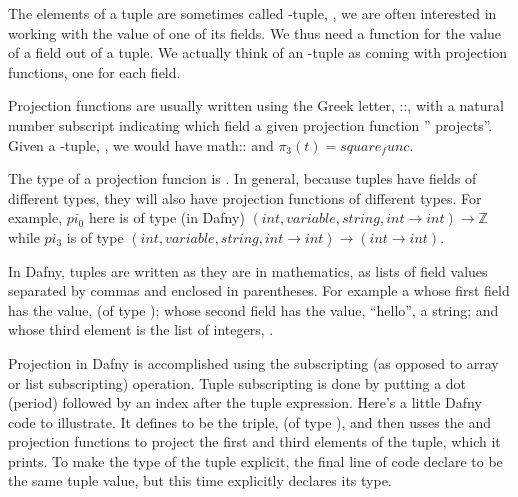\documentclass[letterpaper,10pt,english]{sphinxmanual}
\begin{document}
The elements of a tuple are sometimes called -tuple, , we are often interested in working with the
value of one of its fields. We thus need a function for 
the value of a field out of a tuple. We actually think of an -tuple
as coming with  projection functions, one for each field.

Projection functions are usually written using the Greek letter,
::, with a natural number subscript indicating which field a
given projection function ” projects”. Given a -tuple, , we would have math:: and
\(\pi_3(t) = square_func.\)

The type of a projection funcion is . In general, because tuples have fields of different types, they
will also have projection functions of different types. For example,
\(pi_0\) here is of type (in Dafny) \((int, variable, string,
int \rightarrow int) \rightarrow {\mathbb Z}\) while \(pi_3\) is of
type \((int, variable, string, int \rightarrow int) \rightarrow
(int \rightarrow int).\)

In Dafny, tuples are written as they are in mathematics, as lists of
field values separated by commas and enclosed in parentheses.  For
example  a  whose
first field has the value,  (of type ); whose second field has
the value, “hello”, a string; and whose third element is the list of
integers, \sphinxstyleemphasis{{[}2, 4, 6{]}}.

Projection in Dafny is accomplished using the  subscripting (as
opposed to array or list subscripting) operation. Tuple subscripting is
done by putting a dot (period) followed by an index after the tuple
expression. Here’s a little Dafny code to illustrate. It defines 
to be the triple,  (of type ),
and then usses the  and  projection functions to project the
first and third elements of the tuple, which it prints. To make the
type of the tuple explicit, the final line of code declare  to be
the same tuple value, but this time explicitly declares its type.
\end{document}
